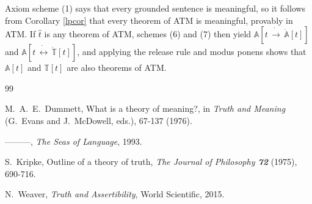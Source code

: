\documentclass{amsart}
\theoremstyle{definition}
\begin{document}
Axiom scheme (1) says that every grounded sentence is meaningful, so it follows from Corollary \ref{lpcor} that every theorem of ATM is meaningful, provably in ATM. If $\hat{t}$ is any theorem of ATM, schemes (6) and (7) then yield $\mathbb{A}[t\, \dot{\to}\, \dot{\mathbb{A}}[t]]$ and $\mathbb{A}[t\, \dot{\leftrightarrow}\, \dot{\mathbb{T}}[t]]$, and applying the release rule and modus ponens shows
that $\mathbb{A}[t]$ and $\mathbb{T}[t]$ are also theorems of ATM.



\begin{thebibliography}{99}

M.\ A.\ E.\ Dummett, What is a theory of meaning?, in {\it Truth and Meaning} (G.\ Evans and J.\ McDowell, eds.), 67-137 (1976).

{---------}, {\it The Seas of Language}, 1993.

S.\ Kripke, Outline of a theory of truth, {\it The Journal of Philosophy \bf 72} (1975), 690-716.

 N.\ Weaver, {\it Truth and Assertibility}, World Scientific, 2015.

\end{thebibliography}
\end{document}
